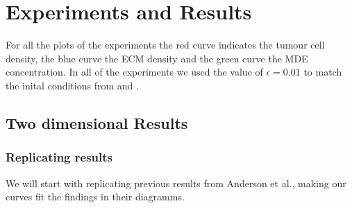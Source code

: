 

\section{Experiments and Results}
For all the plots of the experiments the red curve indicates the tumour cell density, the blue curve the ECM density and the green curve the MDE concentration. In all of the experiments we used the value of $\epsilon = 0.01$ to match the inital conditions from \cite{anderson_mathematical_2000} and \cite{Kolev2010}.
\subsection{Two dimensional Results}
\subsubsection{Replicating results}
We will start with replicating previous results from Anderson et al.\cite{anderson_mathematical_2000}, making our curves fit the findings in their diagramms. 


